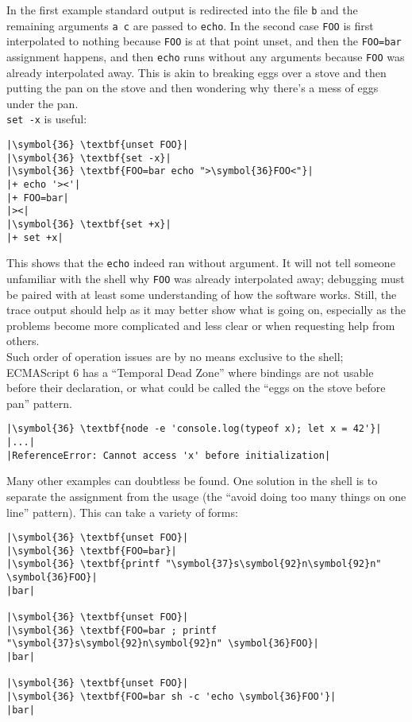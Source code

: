 \documentclass[10pt,a4paper]{article}
\begin{document}
In the first example standard output is redirected into the file
\texttt{b} and the remaining arguments \texttt{a c} are passed to
\texttt{echo}. In the second case \texttt{FOO} is first
interpolated to nothing because \texttt{FOO} is at that point unset, and
then the \texttt{FOO=bar} assignment happens, and then \texttt{echo}
runs without any arguments because \texttt{FOO} was already
interpolated away. This is akin to breaking eggs over a stove and then
putting the pan on the stove and then wondering why there's a mess of
eggs under the pan. \\

\texttt{set -x} is useful:

\begin{lstlisting}
|\symbol{36} \textbf{unset FOO}|
|\symbol{36} \textbf{set -x}|
|\symbol{36} \textbf{FOO=bar echo ">\symbol{36}FOO<"}|
|+ echo '><'|
|+ FOO=bar|
|><|
|\symbol{36} \textbf{set +x}|
|+ set +x|
\end{lstlisting}

This shows that the \texttt{echo} indeed ran without argument. It will
not tell someone unfamiliar with the shell why \texttt{FOO}
was already interpolated away; debugging must be paired with at least
some understanding of how the software works. Still, the trace output
should help as it may better show what is going on, especially as the
problems become more complicated and less clear or when requesting help
from others. \\

Such order of operation issues are by no means exclusive to the shell;
ECMAScript 6 has a ``Temporal Dead Zone'' where bindings are not usable
before their declaration, or what could be called the ``eggs on the
stove before pan'' pattern.

\begin{lstlisting}
|\symbol{36} \textbf{node -e 'console.log(typeof x); let x = 42'}|
|...|
|ReferenceError: Cannot access 'x' before initialization|
\end{lstlisting}

Many other examples can doubtless be found. One solution in the shell is
to separate the assignment from the usage (the ``avoid doing too many
things on one line'' pattern). This can take a variety of forms:

\begin{lstlisting}
|\symbol{36} \textbf{unset FOO}|
|\symbol{36} \textbf{FOO=bar}|
|\symbol{36} \textbf{printf "\symbol{37}s\symbol{92}n\symbol{92}n" \symbol{36}FOO}|
|bar|

|\symbol{36} \textbf{unset FOO}|
|\symbol{36} \textbf{FOO=bar ; printf "\symbol{37}s\symbol{92}n\symbol{92}n" \symbol{36}FOO}|
|bar|

|\symbol{36} \textbf{unset FOO}|
|\symbol{36} \textbf{FOO=bar sh -c 'echo \symbol{36}FOO'}|
|bar|
\end{lstlisting}
\end{document}

